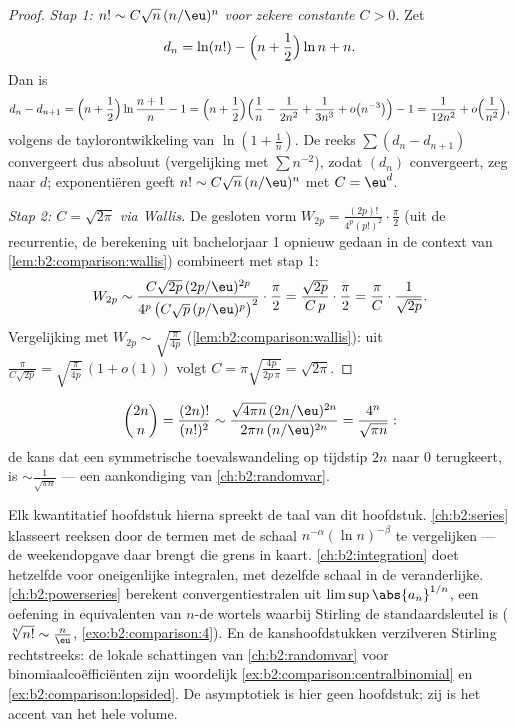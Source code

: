 \begin{proof}
\emph{Stap 1: $n! \sim C \sqrt n\, (n/\eu)^n$ voor zekere
constante $C > 0$.} Zet
\[
d_n = \ln(n!) - \Bigl(n + \frac12\Bigr)\ln n + n .
\]
Dan is
\[
d_n - d_{n+1}
= \Bigl(n + \frac12\Bigr) \ln\frac{n+1}{n} - 1
= \Bigl(n + \frac12\Bigr)\Bigl(\frac1n - \frac{1}{2n^2} +
\frac{1}{3n^3} + o\bigl(n^{-3}\bigr)\Bigr) - 1
= \frac{1}{12n^2} + o\Bigl(\frac{1}{n^2}\Bigr),
\]
volgens de taylorontwikkeling van $\ln(1 + \frac1n)$. De reeks
$\sum (d_n - d_{n+1})$ convergeert dus absoluut (vergelijking met
$\sum n^{-2}$), zodat $(d_n)$ convergeert, zeg naar $d$;
exponentiëren geeft $n! \sim C\sqrt n\,(n/\eu)^n$ met $C =
\eu^{d}$.

\emph{Stap 2: $C = \sqrt{2\pi}$ via Wallis.} De gesloten vorm
$W_{2p} = \frac{(2p)!}{4^p (p!)^2}\cdot\frac\pi2$ (uit de
recurrentie, de berekening uit bachelorjaar 1 opnieuw gedaan in de
context van \cref{lem:b2:comparison:wallis}) combineert met stap
1:
\[
W_{2p} \sim \frac{C\sqrt{2p}\,(2p/\eu)^{2p}}
{4^p\,\bigl(C\sqrt p\,(p/\eu)^p\bigr)^2}\cdot\frac{\pi}{2}
= \frac{\sqrt{2p}}{C\,p}\cdot\frac{\pi}{2}
= \frac{\pi}{C}\cdot\frac{1}{\sqrt{2p}} .
\]
Vergelijking met $W_{2p} \sim \sqrt{\frac{\pi}{4p}}$
(\cref{lem:b2:comparison:wallis}): uit
$\frac{\pi}{C\sqrt{2p}} = \sqrt{\frac{\pi}{4p}}\,(1 + o(1))$ volgt
$C = \pi \sqrt{\frac{4p}{2p\,\pi}} = \sqrt{2\pi}$.
\end{proof}

\begin{example}\label{ex:b2:comparison:centralbinomial}
\[
\binom{2n}{n} = \frac{(2n)!}{(n!)^2}
\sim \frac{\sqrt{4\pi n}\,(2n/\eu)^{2n}}{2\pi n\,(n/\eu)^{2n}}
= \frac{4^n}{\sqrt{\pi n}} :
\]
de kans dat een symmetrische toevalswandeling op tijdstip $2n$
naar $0$ terugkeert, is $\sim \frac{1}{\sqrt{\pi n}}$ --- een
aankondiging van \cref{ch:b2:randomvar}.
\end{example}

\begin{remark}\label{rem:b2:comparison:perspectives}
Elk kwantitatief hoofdstuk hierna spreekt de taal van dit
hoofdstuk. \cref{ch:b2:series} klasseert reeksen door de termen
met de schaal $n^{-\alpha}(\ln n)^{-\beta}$ te vergelijken --- de
weekendopgave daar brengt die grens  in kaart.
\cref{ch:b2:integration} doet hetzelfde voor oneigenlijke
integralen, met dezelfde schaal in de  veranderlijke.
\cref{ch:b2:powerseries} berekent convergentiestralen uit
$\limsup\abs{a_n}^{1/n}$, een oefening in equivalenten van
$n$-de wortels waarbij Stirling de standaardsleutel is
($\sqrt[n]{n!} \sim \frac n\eu$, \cref{exo:b2:comparison:4}). En
de kanshoofdstukken verzilveren Stirling rechtstreeks: de lokale
schattingen van \cref{ch:b2:randomvar} voor
binomiaalcoëfficiënten zijn woordelijk
\cref{ex:b2:comparison:centralbinomial} en
\cref{ex:b2:comparison:lopsided}. De asymptotiek is hier geen
hoofdstuk; zij is het accent van het hele volume.
\end{remark}


